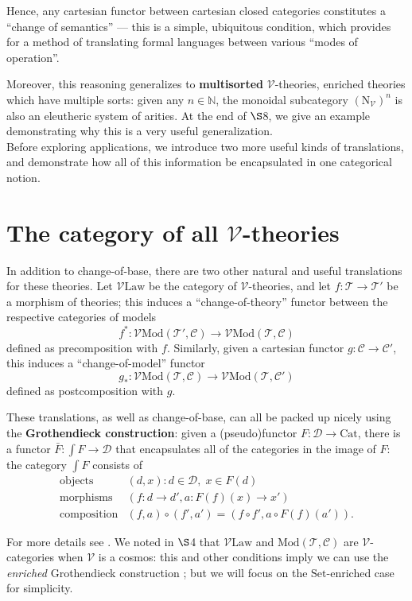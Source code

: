 \documentclass{amsart}
\theoremstyle{definition}
\newcommand{\Set}{\mathrm{Set}}
\newcommand{\Cat}{\mathrm{Cat}}
\newcommand{\Law}{\mathrm{Law}}
\newcommand{\Mod}{\mathrm{Mod}}
\newcommand{\NN}{\mathrm{N}}
\newcommand{\V}{\mathscr{V}}
\newcommand{\D}{\mathscr{D}}
\newcommand{\C}{\mathscr{C}}
\newcommand{\T}{\mathscr{T}}
\newcommand{\maps}{\colon}
\begin{document}
Hence, any cartesian functor between cartesian closed categories constitutes a ``change of semantics'' --- this is a simple, ubiquitous condition, which provides for a method of translating formal languages between various ``modes of operation''.

Moreover, this reasoning generalizes to \textbf{multisorted} $\V$-theories, enriched theories which have multiple sorts: given any $n\in \mathbb{N}$, the monoidal subcategory $(\NN_\V)^n$ is also an eleutheric system of arities. At the end of $\S$8, we give an example demonstrating why this is a very useful generalization.\\

Before exploring applications, we introduce two more useful kinds of translations, and demonstrate how all of this information be encapsulated in one categorical notion.

\section{The category of all $\V$-theories}

In addition to change-of-base, there are two other natural and useful translations for these theories. Let $\V\mathrm{Law}$ be the category of $\V$-theories, and let $f\maps\T\to \T'$ be a morphism of theories; this induces a ``change-of-theory'' functor between the respective categories of models $$f^*\maps\V\Mod(\T',\C)\to \V\Mod(\T,\C)$$ defined as precomposition with $f$. Similarly, given a cartesian functor $g\maps \C \to \C'$, this induces a ``change-of-model'' functor $$g_*\maps\V\Mod(\T,\C) \to \V\Mod(\T,\C')$$ defined as postcomposition with $g$.

These translations, as well as change-of-base, can all be packed up nicely using the \textbf{Grothendieck construction}: given a (pseudo)functor $F\maps \D \to \Cat$, there is a functor $\bar{F}\maps \int F \to \D$ that encapsulates all of the categories in the image of $F$: the category $\int F$ consists of
\[\begin{array}{rl}
\text{objects} & (d,x) : d\in \D, \; x\in F(d)\\
\text{morphisms} & (f\maps d\to d',a\maps F(f)(x)\to x')\\
\text{composition} & (f,a) \circ (f',a') = (f \circ f', a \circ F(f)(a')).
\end{array}\]

 For more details see \cite{borceux,jacobs}.  We noted in $\S$4 that $\V\Law$ and $\Mod(\T,\C)$ are $\V$-categories when $\V$ is a cosmos: this and other conditions imply we can use the \textit{enriched} Grothendieck construction \cite{engroth}; but we will focus on the $\Set$-enriched case for simplicity. 
\end{document}
